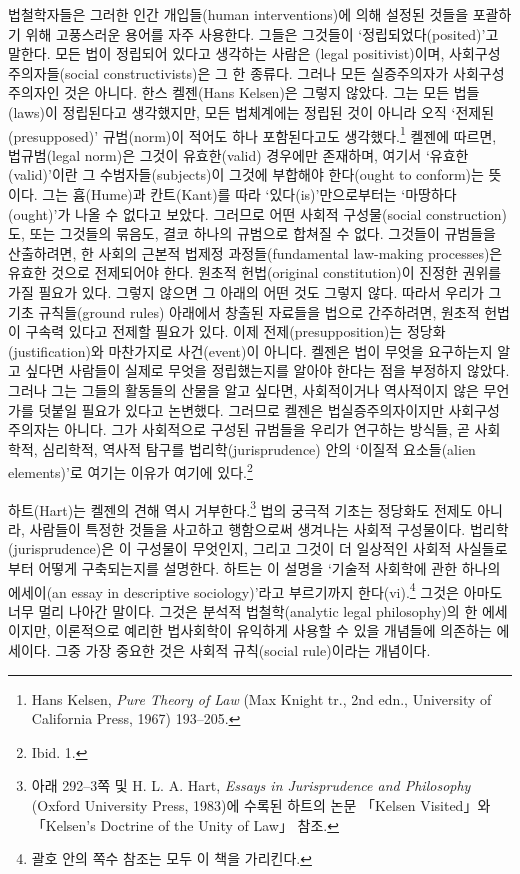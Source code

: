 법철학자들은 그러한 인간 개입들(human interventions)에 의해 설정된
것들을 포괄하기 위해 고풍스러운 용어를 자주 사용한다. 그들은 그것들이
‘정립되었다(posited)’고 말한다. 모든 법이 정립되어 있다고 생각하는
사람은 (legal positivist)이며,
사회구성주의자들(social constructivists)은 그 한 종류다. 그러나 모든
실증주의자가 사회구성주의자인 것은 아니다. 한스 켈젠(Hans Kelsen)은
그렇지 않았다. 그는 모든 법들(laws)이 정립된다고 생각했지만, 모든
법체계에는 정립된 것이 아니라 오직 ‘전제된(presupposed)’ 규범(norm)이
적어도 하나 포함된다고도 생각했다.\footnote{Hans Kelsen, \emph{Pure
  Theory of Law} (Max Knight tr., 2nd edn., University of California
  Press, 1967) 193--205.} 켈젠에 따르면, 법규범(legal norm)은 그것이
유효한(valid) 경우에만 존재하며, 여기서 ‘유효한(valid)’이란 그
수범자들(subjects)이 그것에 부합해야 한다(ought to conform)는 뜻이다.
그는 흄(Hume)과 칸트(Kant)를 따라 ‘있다(is)’만으로부터는
‘마땅하다(ought)’가 나올 수 없다고 보았다. 그러므로 어떤 사회적
구성물(social construction)도, 또는 그것들의 묶음도, 결코 하나의
규범으로 합쳐질 수 없다. 그것들이 규범들을 산출하려면, 한 사회의 근본적
법제정 과정들(fundamental law-making processes)은 유효한 것으로
전제되어야 한다. 원초적 헌법(original constitution)이 진정한 권위를 가질
필요가 있다. 그렇지 않으면 그 아래의 어떤 것도 그렇지 않다. 따라서
우리가 그 기초 규칙들(ground rules) 아래에서 창출된 자료들을 법으로
간주하려면, 원초적 헌법이 구속력 있다고 전제할 필요가 있다. 이제
전제(presupposition)는 정당화(justification)와 마찬가지로 사건(event)이
아니다. 켈젠은 법이 무엇을 요구하는지 알고 싶다면 사람들이 실제로 무엇을
정립했는지를 알아야 한다는 점을 부정하지 않았다. 그러나 그는 그들의
활동들의 산물을  알고 싶다면, 사회적이거나
역사적이지 않은 무언가를 덧붙일 필요가 있다고 논변했다. 그러므로 켈젠은
법실증주의자이지만 사회구성주의자는 아니다. 그가 사회적으로 구성된
규범들을 우리가 연구하는 방식들, 곧 사회학적, 심리학적, 역사적 탐구를
법리학(jurisprudence) 안의 ‘이질적 요소들(alien elements)’로 여기는
이유가 여기에 있다.\footnote{Ibid. 1.}

하트(Hart)는 켈젠의 견해 역시 거부한다.\footnote{아래 292--3쪽 및 H. L.
  A. Hart, \emph{Essays in Jurisprudence and Philosophy} (Oxford
  University Press, 1983)에 수록된 하트의 논문 「Kelsen Visited」와
  「Kelsen's Doctrine of the Unity of Law」 참조.} 법의 궁극적 기초는
정당화도 전제도 아니라, 사람들이 특정한 것들을 사고하고 행함으로써
생겨나는 사회적 구성물이다. 법리학(jurisprudence)은 이 구성물이
무엇인지, 그리고 그것이 더 일상적인 사회적 사실들로부터 어떻게
구축되는지를 설명한다. 하트는 이 설명을 ‘기술적 사회학에 관한 하나의
에세이(an essay in descriptive sociology)’라고 부르기까지
한다(vi).\footnote{괄호 안의 쪽수 참조는 모두 이 책을 가리킨다.} 그것은
아마도 너무 멀리 나아간 말이다. 그것은 분석적 법철학(analytic legal
philosophy)의 한 에세이지만, 이론적으로 예리한 법사회학이 유익하게
사용할 수 있을 개념들에 의존하는 에세이다. 그중 가장 중요한 것은 사회적
규칙(social rule)이라는 개념이다.

